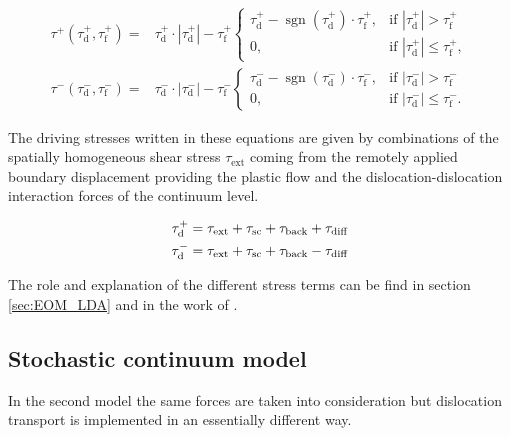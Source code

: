 \begin{equation} \label{eq:pattern_effective}
\begin{aligned}
{\tau ^ + }\left( {\tau _{\text{d}}^ + ,\tau _{\text{f}}^ + } \right) = & \tau _{\text{d}}^ +  \cdot \left| {\tau _{\text{d}}^ + } \right| - \tau _{\text{f}}^ + \begin{cases}
  \tau _{\text{d}}^ +  - \operatorname{sgn} \left( {\tau _{\text{d}}^ + } \right) \cdot \tau _{\text{f}}^ +, & {\text{if }}\left| {\tau _{\text{d}}^ + } \right| > \tau _{\text{f}}^ +  \\ 
  0, & {\text{if }}\left| {\tau _{\text{d}}^ + } \right| \leqslant \tau _{\text{f}}^ + , 
\end{cases} \\
{\tau ^ - }\left( {\tau _{\text{d}}^ - ,\tau _{\text{f}}^ - } \right) = & \tau _{\text{d}}^ -  \cdot \left| {\tau _{\text{d}}^ - } \right| - \tau _{\text{f}}^ - \begin{cases}
  \tau _{\text{d}}^ -  - \operatorname{sgn} \left( {\tau _{\text{d}}^ - } \right) \cdot \tau _{\text{f}}^ -, & {\text{if }}\left| {\tau _{\text{d}}^ - } \right| > \tau _{\text{f}}^ -  \\ 
  0, & {\text{if }}\left| {\tau _{\text{d}}^ - } \right| \leqslant \tau _{\text{f}}^ -  .
\end{cases}
\end{aligned}
\end{equation}

The driving stresses written in these equations are given by combinations of the spatially homogeneous shear stress ${\tau _{{\text{ext}}}}$ coming from the remotely applied boundary displacement providing the plastic flow and the dislocation-dislocation interaction forces of the continuum level.

\begin{equation}
\begin{aligned}
  \tau _{\text{d}}^ +  = {\tau _{{\text{ext}}}} + {\tau _{\text{sc} }} + {\tau _{{\text{back}}}} + {\tau _{{\text{diff}}}} \hfill \\
  \tau _{\text{d}}^ -  = {\tau _{{\text{ext}}}} + {\tau _{\text{sc} }} + {\tau _{{\text{back}}}} - {\tau _{{\text{diff}}}}
\end{aligned}
\end{equation}

The role and explanation of the different stress terms can be find in section \ref{sec:EOM_LDA} and in the work of \citet{PhysRevB.93.214110}.

\subsection{Stochastic continuum model} \label{sec:pattern_models_stoch}
In the second model the same forces are taken into consideration but dislocation transport is implemented in an essentially different way.

